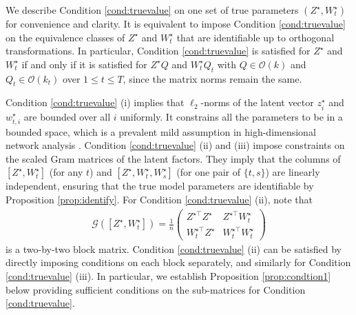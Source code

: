 \documentclass[12pt]{article}
\begin{document}
{We describe Condition \ref{cond:truevalue} on one set of true parameters $(Z^{\star}, W_t^{\star})$ for convenience and clarity.
It is equivalent to impose Condition \ref{cond:truevalue}  on the equivalence classes of $Z^{\star}$ and $ W_t^{\star}$ that are identifiable up to orthogonal transformations. 
In particular,  Condition \ref{cond:truevalue} is satisfied for $Z^{\star}$ and $W_t^{\star}$ if and only if it is satisfied for $Z^{\star}Q$ and $W_t^{\star}Q_t$ with $Q\in \mathcal{O}(k)$ and $Q_t\in \mathcal{O}(k_t)$ over $1\leqslant t\leqslant T$, since the matrix norms remain the same.} 

 Condition \ref{cond:truevalue} (i) implies that  $\ell_2$-norms of the latent vector $z_i^\star$ and $w_{t,i}^\star$  are bounded over all $i$ uniformly.
 It constrains all the parameters to be in a bounded space, 
 which is a prevalent mild assumption in high-dimensional network analysis \citep{ ma2020universal, zheng2022limit}. 
 Condition \ref{cond:truevalue} (ii) and (iii) impose  constraints on the scaled  Gram matrices of the latent factors.
They imply that the columns of $[Z^{\star}, W_t^{\star}]$ (for any $t$) and $[Z^{\star}, W_t^{\star}, W_s^{\star}]$ (for one pair of $\{t,s\}$) are linearly independent, ensuring that the true model parameters are identifiable by Proposition \ref{prop:identify}. 
For Condition \ref{cond:truevalue} (ii),  note that 
\begin{align*}
    \mathcal{G}([Z^\star, W_t^\star]) = \frac{1}{n} \begin{pmatrix}
        Z^{\star \top} Z^\star & Z^{\star \top} W_t^\star\\
        W_t^{\star \top} Z^\star &  W_t^{\star \top} W_t^\star
    \end{pmatrix} 
\end{align*}
is a two-by-two block matrix. Condition \ref{cond:truevalue} (ii) can be satisfied by directly imposing conditions on each block separately, and similarly for   Condition \ref{cond:truevalue} (iii).
In particular, we establish Proposition  \ref{prop:condtion1} below providing sufficient conditions on the sub-matrices for Condition   \ref{cond:truevalue}. %
\end{document}

